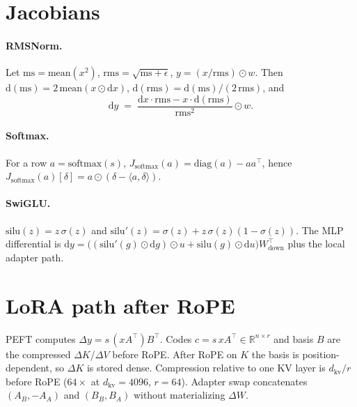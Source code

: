 \documentclass{article}
\begin{document}



\appendix
\section{Jacobians}
\label{app:jac}

\paragraph{RMSNorm.}
Let $\mathrm{ms}=\mathrm{mean}(x^2)$, $\mathrm{rms}=\sqrt{\mathrm{ms}+\epsilon}$,
$y=(x/\mathrm{rms})\odot w$.
Then $\mathrm{d}(\mathrm{ms})=2\,\mathrm{mean}(x\odot\mathrm{d}x)$,
$\mathrm{d}(\mathrm{rms})=\mathrm{d}(\mathrm{ms})/(2\,\mathrm{rms})$, and
\begin{equation}
  \mathrm{d}y
  \;=\;
  \frac{\mathrm{d}x\cdot\mathrm{rms}-x\cdot\mathrm{d}(\mathrm{rms})}{\mathrm{rms}^2}\odot w.
\end{equation}

\paragraph{Softmax.}
For a row $a=\mathrm{softmax}(s)$,
$J_{\mathrm{softmax}}(a)=\mathrm{diag}(a)-aa^\top$, hence
$J_{\mathrm{softmax}}(a)[\delta]=a\odot(\delta-\langle a,\delta\rangle)$.

\paragraph{SwiGLU.}
$\mathrm{silu}(z)=z\,\sigma(z)$ and
$\mathrm{silu}'(z)=\sigma(z)+z\,\sigma(z)(1-\sigma(z))$.
The MLP differential is
$\mathrm{d}y=\bigl((\mathrm{silu}'(g)\odot\mathrm{d}g)\odot u
+\mathrm{silu}(g)\odot\mathrm{d}u\bigr)W_{\mathrm{down}}^\top$
plus the local adapter path.

\section{LoRA path after RoPE}
\label{app:lora}

PEFT computes $\Delta y=s\,(xA^\top)B^\top$.
Codes $c=s\,xA^\top\in\mathbb{R}^{n\times r}$ and basis $B$ are the
compressed $\Delta K$/$\Delta V$ before RoPE.
After RoPE on $K$ the basis is position-dependent, so $\Delta K$ is
stored dense.
Compression relative to one KV layer is $d_{\mathrm{kv}}/r$ before RoPE
($64\times$ at $d_{\mathrm{kv}}=4096$, $r=64$).
Adapter swap concatenates $(A_B,-A_A)$ and $(B_B,B_A)$ without
materializing $\Delta W$.
\end{document}
